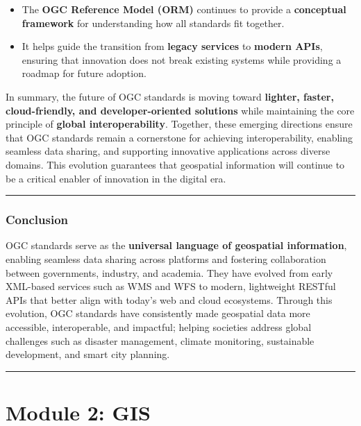 \documentclass[
  11pt,
  letterpaper,
]{book}
\providecommand{\tightlist}{%
  \setlength{\itemsep}{0pt}\setlength{\parskip}{0pt}}
\begin{document}
\begin{itemize}
\tightlist
\item
  The \textbf{OGC Reference Model (ORM)} continues to provide a
  \textbf{conceptual framework} for understanding how all standards fit
  together.\\
\item
  It helps guide the transition from \textbf{legacy services} to
  \textbf{modern APIs}, ensuring that innovation does not break existing
  systems while providing a roadmap for future adoption.
\end{itemize}

In summary, the future of OGC standards is moving toward
\textbf{lighter, faster, cloud-friendly, and developer-oriented
solutions} while maintaining the core principle of \textbf{global
interoperability}. Together, these emerging directions ensure that OGC
standards remain a cornerstone for achieving interoperability, enabling
seamless data sharing, and supporting innovative applications across
diverse domains. This evolution guarantees that geospatial information
will continue to be a critical enabler of innovation in the digital era.

\begin{center}\rule{0.5\linewidth}{0.5pt}\end{center}

\section{Conclusion}\label{conclusion-4}

OGC standards serve as the \textbf{universal language of geospatial
information}, enabling seamless data sharing across platforms and
fostering collaboration between governments, industry, and academia.
They have evolved from early XML-based services such as WMS and WFS to
modern, lightweight RESTful APIs that better align with today's web and
cloud ecosystems. Through this evolution, OGC standards have
consistently made geospatial data more accessible, interoperable, and
impactful; helping societies address global challenges such as disaster
management, climate monitoring, sustainable development, and smart city
planning.

\begin{center}\rule{0.5\linewidth}{0.5pt}\end{center}

\part{Module 2: GIS}
\end{document}

